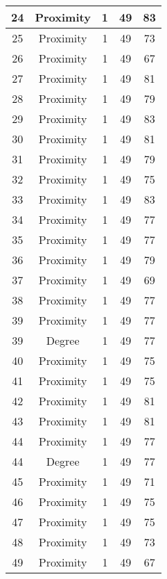 \documentclass[results.tex]{subfiles}
\begin{document}
\begin{center}
\begin{tabular}{| c || c | c | c | c |}
    \hline
    24 & Proximity & 1 & 49 & 83 \\ 
    \hline
    25 & Proximity & 1 & 49 & 73 \\ 
    \hline
    26 & Proximity & 1 & 49 & 67 \\ 
    \hline
    27 & Proximity & 1 & 49 & 81 \\ 
    \hline
    28 & Proximity & 1 & 49 & 79 \\ 
    \hline
    29 & Proximity & 1 & 49 & 83 \\ 
    \hline
    30 & Proximity & 1 & 49 & 81 \\ 
    \hline
    31 & Proximity & 1 & 49 & 79 \\ 
    \hline
    32 & Proximity & 1 & 49 & 75 \\ 
    \hline
    33 & Proximity & 1 & 49 & 83 \\ 
    \hline
    34 & Proximity & 1 & 49 & 77 \\ 
    \hline
    35 & Proximity & 1 & 49 & 77 \\ 
    \hline
    36 & Proximity & 1 & 49 & 79 \\ 
    \hline
    37 & Proximity & 1 & 49 & 69 \\ 
    \hline
    38 & Proximity & 1 & 49 & 77 \\ 
    \hline
    39 & Proximity & 1 & 49 & 77 \\ 
    \hline
    39 & Degree & 1 & 49 & 77 \\ 
    \hline
    40 & Proximity & 1 & 49 & 75 \\ 
    \hline
    41 & Proximity & 1 & 49 & 75 \\ 
    \hline
    42 & Proximity & 1 & 49 & 81 \\ 
    \hline
    43 & Proximity & 1 & 49 & 81 \\ 
    \hline
    44 & Proximity & 1 & 49 & 77 \\ 
    \hline
    44 & Degree & 1 & 49 & 77 \\ 
    \hline
    45 & Proximity & 1 & 49 & 71 \\ 
    \hline
    46 & Proximity & 1 & 49 & 75 \\ 
    \hline
    47 & Proximity & 1 & 49 & 75 \\ 
    \hline
    48 & Proximity & 1 & 49 & 73 \\ 
    \hline
    49 & Proximity & 1 & 49 & 67 \\ 
    \hline   \end{tabular}
\end{center}
\end{document}
